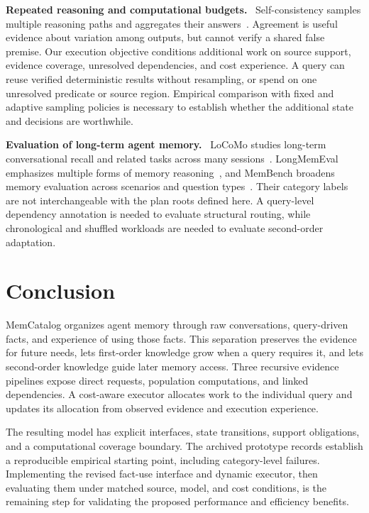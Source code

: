 \documentclass[10pt,twocolumn]{article}
\newcommand{\sys}{MemCatalog}
\newcommand{\runin}[1]{\smallskip\noindent\textbf{#1.}\ }
\begin{document}
\runin{Repeated reasoning and computational budgets}
Self-consistency samples multiple reasoning paths and aggregates their
answers~\cite{selfconsistency}. Agreement is useful evidence about
variation among outputs, but cannot verify a shared false premise.
Our execution objective conditions additional work on source support,
evidence coverage, unresolved dependencies, and cost experience.
A query can reuse verified deterministic results without resampling,
or spend on one unresolved predicate or source region. Empirical
comparison with fixed and adaptive sampling policies is necessary to
establish whether the additional state and decisions are worthwhile.

\runin{Evaluation of long-term agent memory}
LoCoMo studies long-term conversational recall and related tasks across
many sessions~\cite{locomo}. LongMemEval emphasizes multiple forms of
memory reasoning~\cite{longmemeval}, and MemBench broadens memory
evaluation across scenarios and question types~\cite{membench}.
Their category labels are not interchangeable with the plan roots
defined here. A query-level dependency annotation is needed to
evaluate structural routing, while chronological and shuffled
workloads are needed to evaluate second-order adaptation.

\section{Conclusion}
\label{sec:new-conclusion}

\sys{} organizes agent memory through raw conversations, query-driven
facts, and experience of using those facts. This separation preserves
the evidence for future needs, lets first-order knowledge grow when a
query requires it, and lets second-order knowledge guide later memory
access. Three recursive evidence pipelines expose direct requests,
population computations, and linked dependencies. A cost-aware executor
allocates work to the individual query and updates its allocation from
observed evidence and execution experience.

The resulting model has explicit interfaces, state transitions,
support obligations, and a computational coverage boundary. The
archived prototype records establish a reproducible empirical starting
point, including category-level failures. Implementing the revised
fact-use interface and dynamic executor, then evaluating them under
matched source, model, and cost conditions, is the remaining step for
validating the proposed performance and efficiency benefits.
\end{document}
